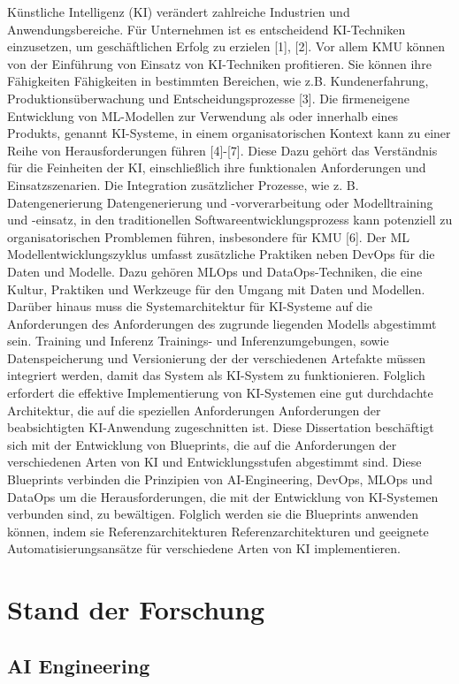 \documentclass[11pt,a4paper,pointlessnumbers]{scrartcl}
\theoremstyle{break}
\numberwithin{equation}{section}
\begin{document}
Künstliche Intelligenz (KI) verändert zahlreiche Industrien
und Anwendungsbereiche. Für Unternehmen ist es entscheidend
KI-Techniken einzusetzen, um geschäftlichen Erfolg zu erzielen
[1], [2]. Vor allem KMU können von der Einführung von
Einsatz von KI-Techniken profitieren. Sie können ihre Fähigkeiten
Fähigkeiten in bestimmten Bereichen, wie z.B. Kundenerfahrung,
Produktionsüberwachung und Entscheidungsprozesse [3].
Die firmeneigene Entwicklung von ML-Modellen zur Verwendung als
oder innerhalb eines Produkts, genannt KI-Systeme, in einem organisatorischen
Kontext kann zu einer Reihe von Herausforderungen führen [4]-[7]. Diese
Dazu gehört das Verständnis für die Feinheiten der KI, einschließlich
ihre funktionalen Anforderungen und Einsatzszenarien. Die
Integration zusätzlicher Prozesse, wie z. B. Datengenerierung
Datengenerierung und -vorverarbeitung oder Modelltraining und -einsatz, in den
traditionellen Softwareentwicklungsprozess kann potenziell zu organisatorischen
 Promblemen führen, insbesondere für KMU [6]. Der ML
Modellentwicklungszyklus umfasst zusätzliche Praktiken
neben DevOps für die Daten und Modelle. Dazu gehören MLOps
und DataOps-Techniken, die eine Kultur, Praktiken
und Werkzeuge für den Umgang mit Daten und Modellen. Darüber hinaus muss die
Systemarchitektur für KI-Systeme auf die Anforderungen des
Anforderungen des zugrunde liegenden Modells abgestimmt sein. Training und Inferenz
Trainings- und Inferenzumgebungen, sowie Datenspeicherung und Versionierung der
der verschiedenen Artefakte müssen integriert werden, damit das
System als KI-System zu funktionieren.
Folglich erfordert die effektive Implementierung von KI-Systemen
eine gut durchdachte Architektur, die auf die speziellen Anforderungen
Anforderungen der beabsichtigten KI-Anwendung zugeschnitten ist. Diese Dissertation
beschäftigt sich mit der Entwicklung von Blueprints, die auf die Anforderungen
der verschiedenen Arten von KI und Entwicklungsstufen abgestimmt sind. Diese Blueprints verbinden 
die Prinzipien von AI-Engineering, DevOps, MLOps und DataOps um die Herausforderungen, die mit der 
Entwicklung von KI-Systemen verbunden sind, zu bewältigen. Folglich werden sie
die Blueprints anwenden können, indem sie Referenzarchitekturen
Referenzarchitekturen und geeignete Automatisierungsansätze für verschiedene
Arten von KI implementieren.


\section{Stand der Forschung}
\subsection{AI Engineering}
\end{document}
